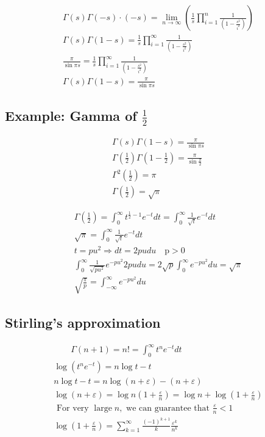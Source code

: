 	$$\begin{gathered}\Gamma(s) \Gamma(-s) \cdot(-s)=\lim _{n \rightarrow \infty}\left(\frac{1}{s} \prod_{i=1}^n \frac{1}{\left(1-\frac{s^2}{i^2}\right)}\right) \\ \Gamma(s) \Gamma(1-s)=\frac{1}{s} \prod_{i=1}^{\infty} \frac{1}{\left(1-\frac{s^2}{i^2}\right)} \\ \frac{\pi}{\sin \pi s}=\frac{1}{s} \prod_{i=1}^{\infty} \frac{1}{\left(1-\frac{s^2}{i^2}\right)} \\ \Gamma\left(s\right) \Gamma(1-s)=\frac{\pi}{\sin \pi s}\end{gathered}$$
	
	\subsection{Example: Gamma of $\frac{1}{2}$}
	
	$$\begin{gathered}\Gamma(s) \Gamma(1-s)=\frac{\pi}{\sin \pi s} \\ \Gamma\left(\frac{1}{2}\right) \Gamma\left(1-\frac{1}{2}\right)=\frac{\pi}{\sin \frac{\pi}{2}} \\ \Gamma^2\left(\frac{1}{2}\right)=\pi \\ \Gamma\left(\frac{1}{2}\right)=\sqrt{\pi}\end{gathered}$$
	
	$$
	\begin{gathered}
		\Gamma\left(\frac{1}{2}\right)=\int_0^{\infty} t^{\frac{1}{2}-1} e^{-t} d t=\int_0^{\infty} \frac{1}{\sqrt{t}} e^{-t} d t \\
		\sqrt{\pi}=\int_0^{\infty} \frac{1}{\sqrt{t}} e^{-t} d t \\
		t=p u^2 \Rightarrow d t=2 p u d u \quad \mathrm{p}>0 \\
		\int_0^{\infty} \frac{1}{\sqrt{p u^2}} e^{-p u^2} 2 p u d u=2 \sqrt{p} \int_0^{\infty} e^{-p u^2} d u=\sqrt{\pi} \\
		\sqrt{\frac{\pi}{p}}=\int_{-\infty}^{\infty} e^{-p u^2} d u
	\end{gathered}
	$$
	
	\subsection{Stirling's approximation}
	
	$$
	\begin{gathered}
		\qquad \Gamma(n+1)=n !=\int_0^{\infty} t^n e^{-t} d t \\
		\log \left(t^n e^{-t}\right)=n \log t-t \\
		n \log t-t=n \log (n+\varepsilon)-(n+\varepsilon) \\
		\log (n+\varepsilon)=\log n\left(1+\frac{\varepsilon}{n}\right)=\log n+\log \left(1+\frac{\varepsilon}{n}\right) \\
		\text { For very } \operatorname{large} n, \text { we can guarantee that } \frac{\varepsilon}{n}<1 \\
		\log \left(1+\frac{\varepsilon}{n}\right)=\sum_{k=1}^{\infty} \frac{(-1)^{k+1}}{k} \frac{\varepsilon^k}{n^k}
	\end{gathered}
	$$
	
